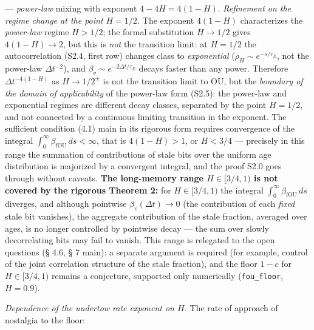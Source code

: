 \documentclass[12pt]{iopart}
\begin{document}
--- \emph{power-law} mixing with exponent \(4-4H = 4(1-H)\). \emph{Refinement on the regime change at the point \(H = 1/2\).} The exponent \(4(1-H)\) characterizes the \emph{power-law} regime \(H > 1/2\); the formal substitution \(H \to 1/2\) gives \(4(1-H) \to 2\), but this is \emph{not} the transition limit: at \(H = 1/2\) the autocorrelation (S2.4, first row) changes class to \emph{exponential} (\(\rho_H \sim e^{-s/\tau_E}\), not the power-law \(\Delta t^{-2}\)), and \(\beta_v \sim e^{-2\Delta t/\tau_E}\) decays faster than any power. Therefore \(\Delta t^{-4(1-H)}\) as \(H \to 1/2^+\) is not the transition limit to OU, but the \emph{boundary of the domain of applicability} of the power-law form (S2.5): the power-law and exponential regimes are different decay classes, separated by the point \(H = 1/2\), and not connected by a continuous limiting transition in the exponent. The sufficient condition (4.1) main in its rigorous form requires convergence of the integral \(\int_0^\infty\beta_{\text{fOU}}\,ds < \infty\), that is \(4(1-H) > 1\), or \(H < 3/4\) --- precisely in this range the summation of contributions of stale bits over the uniform age distribution is majorized by a convergent integral, and the proof S2.0 goes through without caveats. \textbf{The long-memory range \(H \in [3/4, 1)\) is not covered by the rigorous Theorem 2:} for \(H \in [3/4, 1)\) the integral \(\int_0^\infty\beta_{\text{fOU}}\,ds\) diverges, and although pointwise \(\beta_v(\Delta t) \to 0\) (the contribution of each \emph{fixed} stale bit vanishes), the aggregate contribution of the stale fraction, averaged over ages, is no longer controlled by pointwise decay --- the sum over slowly decorrelating bits may fail to vanish. This range is relegated to the open questions (§ 4.6, § 7 main): a separate argument is required (for example, control of the joint correlation structure of the stale fraction), and the floor \(1-c\) for \(H \in [3/4,1)\) remains a conjecture, supported only numerically (\texttt{fou\_floor}, \(H = 0.9\)).



\emph{Dependence of the undertow rate exponent on \(H\).} The rate of approach of nostalgia to the floor:
\end{document}
